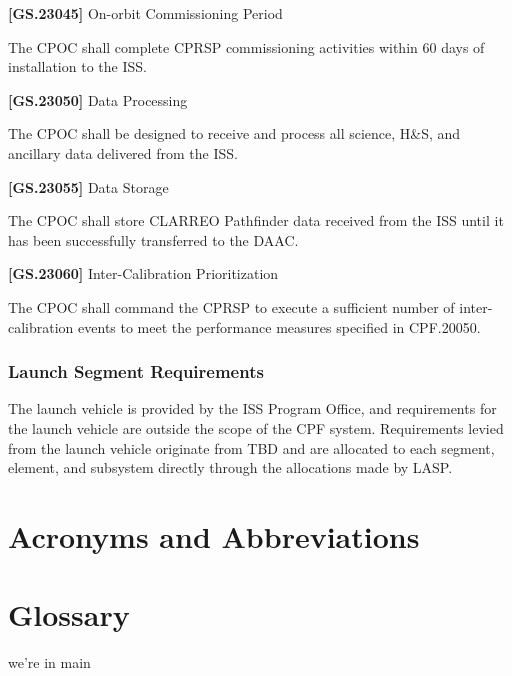\documentclass[12pt,oneside,oldfontcommands]{memoir}
\renewcommand{\entryname}{Acronym}
\renewcommand{\descriptionname}{Complete Term}
\def\bibliostyle{plain}
\begin{document}
\textbf{[GS.23045]} On-orbit Commissioning Period

The \gls{CPOC} shall complete \gls{CPRSP} commissioning activities within 60 days of installation to the \gls{ISS}.

\textbf{[GS.23050]} Data Processing

The \gls{CPOC} shall be designed to receive and process all science, H\&S, and ancillary data delivered from the \gls{ISS}.

\textbf{[GS.23055]} Data Storage

The \gls{CPOC} shall store \gls{CLARREO} Pathfinder data received from the \gls{ISS} until it has been successfully transferred to the \gls{DAAC}.

\textbf{[GS.23060]} Inter-Calibration Prioritization

The \gls{CPOC} shall command the \gls{CPRSP} to execute a sufficient number of inter-calibration events to meet the performance \gls{measure}s specified in \gls{CPF}.20050.

\subsection{Launch Segment Requirements}
\label{launchsegmentrequirements}

The launch vehicle is provided by the \gls{ISS} Program Office, and requirements for the launch vehicle are outside the scope of the \gls{CPF} system. Requirements levied from the launch vehicle originate from TBD\label{tbx_2} and are allocated to each segment, element, and subsystem directly through the allocations made by \gls{LASP}.


\begin{appendices}


\chapter{Acronyms and Abbreviations  }
\label{sec_acros}

\printglossary[type=\acronymtype]

\chapter{Glossary  }
\label{sec_gls}


\renewcommand{\entryname}{Term}
\renewcommand{\descriptionname}{Definition}
\printglossary


\end{appendices}

% 
%
%


\if@mainmatter
	we're in main
	\backmatter
\fi



\ifx\bibliocommand\undefined
\else
	
	\bibliocommand
\fi






\end{document}
